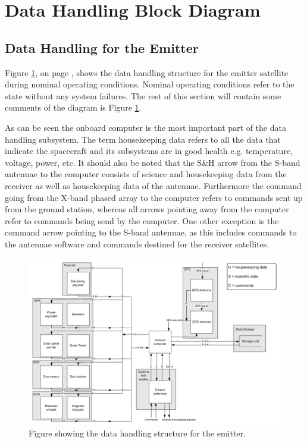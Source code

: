 \section{Data Handling Block Diagram}
\label{DHBD}

\subsection{Data Handling for the Emitter}
\label{DataHandlingEmitter}

Figure \ref{fig:DHE}, on page \pageref{fig:DHE}, shows the data handling structure for the emitter satellite during nominal operating conditions. Nominal operating conditions refer to the state without any system failures. The rest of this section will contain some comments of the diagram is Figure \ref{fig:DHE}.

As can be seen the onboard computer is the most important part of the data handling subsystem. The term housekeeping data refers to all the data that indicate the spacecraft and its subsystems are in good health e.g. temperature, voltage, power, etc. It should also be noted that the S\&H arrow from the S-band antennae to the computer consists of science and housekeeping data from the receiver as well as  housekeeping data of the antennae. Furthermore the command going from the X-band phased array to the computer refers to commands sent up from the ground station, whereas all arrows pointing away from the computer refer to commands being send by the computer. One other exception is the command arrow pointing to the S-band antennae, as this includes commands to the antennae software and commands destined for the receiver satellites.

\begin{figure}
\centering
\includegraphics[width=1.0\textwidth, angle=90]{chapters/img/DHReceiver.png}
\caption{Figure showing the data handling structure for the emitter.}
\label{fig:DHE}
\end{figure}

